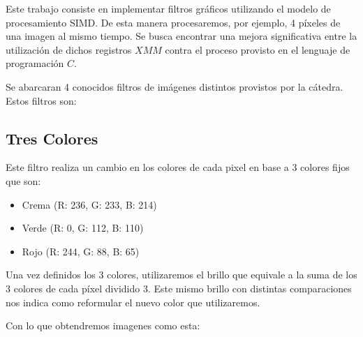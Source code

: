 Este trabajo consiste en implementar filtros gráficos utilizando el modelo de procesamiento SIMD. De esta manera procesaremos, por ejemplo, 4 píxeles de una imagen al mismo tiempo. Se busca encontrar una mejora significativa entre la utilización de dichos registros $XMM$ contra el proceso provisto en el lenguaje de programación $C$. 

Se abarcaran 4 conocidos filtros de imágenes distintos provistos por la cátedra. Estos filtros son:

\subsection{Tres Colores}

Este filtro realiza un cambio en los colores de cada pixel en base a 3 colores fijos que son: 

\begin{itemize}
  \item Crema (R: 236, G: 233, B: 214)
  \item Verde (R: 0, G: 112, B: 110)
  \item Rojo (R: 244, G: 88, B: 65)
\end{itemize}

Una vez definidos los 3 colores, utilizaremos el brillo que equivale a la suma de los 3 colores de cada píxel dividido 3. Este mismo brillo con distintas comparaciones nos indica como reformular el nuevo color que utilizaremos.

Con lo que obtendremos imagenes como esta:

